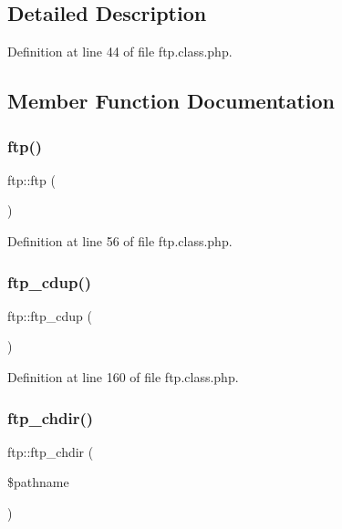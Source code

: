 \subsection{Detailed Description}


Definition at line 44 of file ftp.\+class.\+php.



\subsection{Member Function Documentation}
\hypertarget{classftp_af893414db9d682963b2d557377cec64b}{}\label{classftp_af893414db9d682963b2d557377cec64b} 
\subsubsection{\texorpdfstring{ftp()}{ftp()}}
{\footnotesize\ttfamily ftp\+::ftp (\begin{DoxyParamCaption}{ }\end{DoxyParamCaption})}



Definition at line 56 of file ftp.\+class.\+php.

\hypertarget{classftp_a38fef3185c44245718609e4755d461f7}{}\label{classftp_a38fef3185c44245718609e4755d461f7} 
\subsubsection{\texorpdfstring{ftp\+\_\+cdup()}{ftp\_cdup()}}
{\footnotesize\ttfamily ftp\+::ftp\+\_\+cdup (\begin{DoxyParamCaption}{ }\end{DoxyParamCaption})}



Definition at line 160 of file ftp.\+class.\+php.

\hypertarget{classftp_ace0f5ec50ca808236dce6a108dc28c63}{}\label{classftp_ace0f5ec50ca808236dce6a108dc28c63} 
\subsubsection{\texorpdfstring{ftp\+\_\+chdir()}{ftp\_chdir()}}
{\footnotesize\ttfamily ftp\+::ftp\+\_\+chdir (\begin{DoxyParamCaption}\item[{}]{\$pathname }\end{DoxyParamCaption})}




